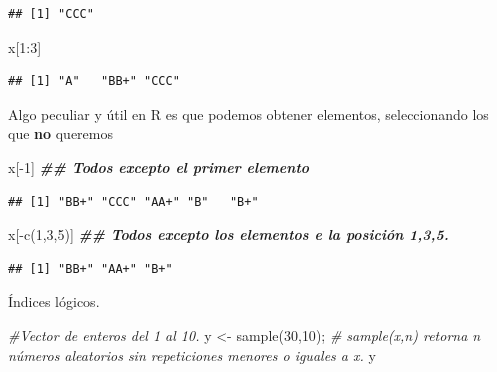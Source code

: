\documentclass[
  12pt,
]{book}
\newenvironment{Shaded}{\begin{snugshade}}{\end{snugshade}}
\newcommand{\CommentTok}[1]{\textcolor[rgb]{0.56,0.35,0.01}{\textit{#1}}}
\newcommand{\DecValTok}[1]{\textcolor[rgb]{0.00,0.00,0.81}{#1}}
\newcommand{\DocumentationTok}[1]{\textcolor[rgb]{0.56,0.35,0.01}{\textbf{\textit{#1}}}}
\newcommand{\FunctionTok}[1]{\textcolor[rgb]{0.00,0.00,0.00}{#1}}
\newcommand{\NormalTok}[1]{#1}
\newcommand{\OtherTok}[1]{\textcolor[rgb]{0.56,0.35,0.01}{#1}}
\newcommand{\SpecialCharTok}[1]{\textcolor[rgb]{0.00,0.00,0.00}{#1}}
\begin{document}
\begin{verbatim}
## [1] "CCC"
\end{verbatim}

\begin{Shaded}
\begin{Highlighting}[]
\NormalTok{x[}\DecValTok{1}\SpecialCharTok{:}\DecValTok{3}\NormalTok{]}
\end{Highlighting}
\end{Shaded}

\begin{verbatim}
## [1] "A"   "BB+" "CCC"
\end{verbatim}

Algo peculiar y útil en R es que podemos obtener elementos, seleccionando los que \textbf{no} queremos

\begin{Shaded}
\begin{Highlighting}[]
\NormalTok{x[}\SpecialCharTok{{-}}\DecValTok{1}\NormalTok{]  }\DocumentationTok{\#\# Todos excepto el primer elemento}
\end{Highlighting}
\end{Shaded}

\begin{verbatim}
## [1] "BB+" "CCC" "AA+" "B"   "B+"
\end{verbatim}

\begin{Shaded}
\begin{Highlighting}[]
\NormalTok{x[}\SpecialCharTok{{-}}\FunctionTok{c}\NormalTok{(}\DecValTok{1}\NormalTok{,}\DecValTok{3}\NormalTok{,}\DecValTok{5}\NormalTok{)] }\DocumentationTok{\#\# Todos excepto los elementos e la posición 1,3,5.}
\end{Highlighting}
\end{Shaded}

\begin{verbatim}
## [1] "BB+" "AA+" "B+"
\end{verbatim}

Índices lógicos.

\begin{Shaded}
\begin{Highlighting}[]
\CommentTok{\#Vector de enteros del 1 al 10.}
\NormalTok{y }\OtherTok{\textless{}{-}} \FunctionTok{sample}\NormalTok{(}\DecValTok{30}\NormalTok{,}\DecValTok{10}\NormalTok{);  }\CommentTok{\# sample(x,n) retorna n números aleatorios sin repeticiones menores o iguales a x.}
\NormalTok{y}
\end{Highlighting}
\end{Shaded}
\end{document}
